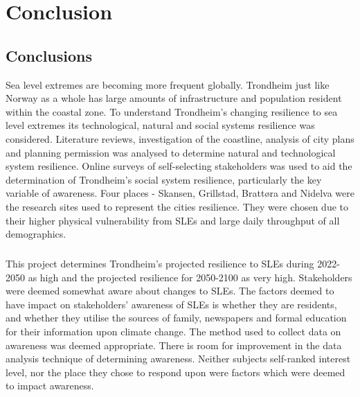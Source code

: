 

\chapter{Conclusion}
\section{Conclusions}
Sea level extremes are becoming more frequent globally. Trondheim just like Norway as a whole has large amounts of infrastructure and population resident within the coastal zone. To understand Trondheim's changing resilience to sea level extremes its technological, natural and social systems resilience was considered. Literature reviews, investigation of the coastline, analysis of city plans and planning permission was analysed to determine natural and technological system resilience. Online surveys of self-selecting stakeholders was used to aid the determination of Trondheim's social system resilience, particularly the key variable of awareness. Four places - Skansen, Grillstad, Brattøra and Nidelva were the research sites used to represent the cities resilience. They were chosen due to their higher physical vulnerability from SLEs and large daily throughput of all demographics.
\paragraph{}
This project determines Trondheim's projected resilience to SLEs during 2022-2050 as high and the projected resilience for 2050-2100 as very high. Stakeholders were deemed somewhat aware about changes to SLEs. The factors deemed to have impact on stakeholders' awareness of SLEs is whether they are residents, and whether they utilise the sources of family, newspapers and formal education for their information upon climate change. The method used to collect data on awareness was deemed appropriate. There is room for improvement in the data analysis technique of determining awareness. Neither subjects self-ranked interest level, nor the place they chose to respond upon were factors which were deemed to impact awareness.
